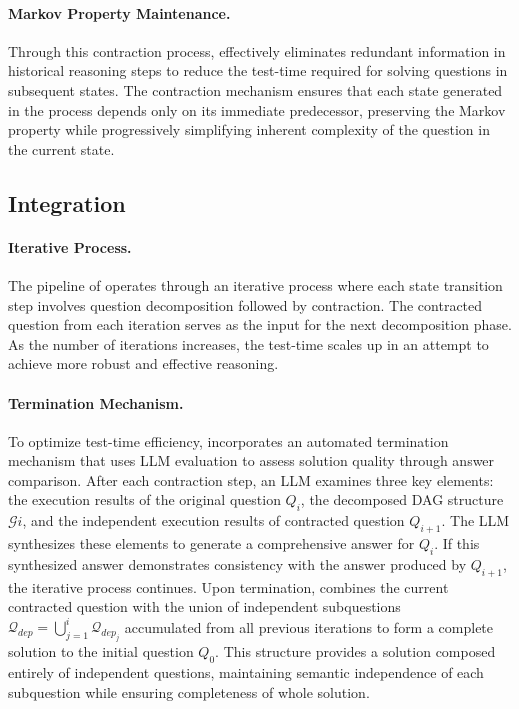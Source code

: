 \paragraph{Markov Property Maintenance.}
Through this contraction process, \our effectively eliminates redundant information in historical reasoning steps to reduce the test-time required for solving questions in subsequent states. The contraction mechanism ensures that each state generated in the process depends only on its immediate predecessor, preserving the Markov property while progressively simplifying inherent complexity of the question in the current state.

\subsection{Integration}

\paragraph{Iterative Process.}
The pipeline of \our operates through an iterative process where each state transition step involves question decomposition followed by contraction. The contracted question from each iteration serves as the input for the next decomposition phase. As the number of iterations increases, the test-time scales up in an attempt to achieve more robust and effective reasoning.

\paragraph{Termination Mechanism.}
To optimize test-time efficiency, \our incorporates an automated termination mechanism that uses LLM evaluation to assess solution quality through answer comparison. After each contraction step, an LLM examines three key elements: the execution results of the original question $Q_{i}$, the decomposed DAG structure $\mathcal{G}i$, and the independent execution results of contracted question $Q_{i+1}$. The LLM synthesizes these elements to generate a comprehensive answer for $Q_i$. If this synthesized answer demonstrates consistency with the answer produced by $Q_{i+1}$, the iterative process continues. Upon termination, \our combines the current contracted question with the union of independent subquestions $\mathcal{Q}_{dep} = \bigcup_{j=1}^i \mathcal{Q}_{dep_j}$ accumulated from all previous iterations to form a complete solution to the initial question $Q_0$. This structure provides a solution composed entirely of independent questions, maintaining semantic independence of each subquestion while ensuring completeness of whole solution.

